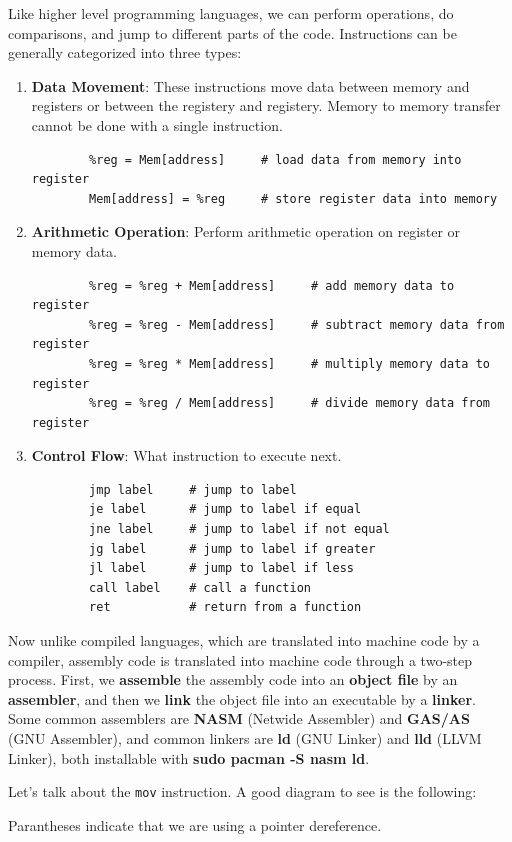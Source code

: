 \documentclass{article}
\begin{document}
  Like higher level programming languages, we can perform operations, do comparisons, and jump to different parts of the code. Instructions can be generally categorized into three types: 
  \begin{enumerate} 
    \item \textbf{Data Movement}: These instructions move data between memory and registers or between the registery and registery. Memory to memory transfer cannot be done with a single instruction. 
      \begin{lstlisting} 
        %reg = Mem[address]     # load data from memory into register
        Mem[address] = %reg     # store register data into memory
      \end{lstlisting}
    \item \textbf{Arithmetic Operation}: Perform arithmetic operation on register or memory data. 
      \begin{lstlisting} 
        %reg = %reg + Mem[address]     # add memory data to register
        %reg = %reg - Mem[address]     # subtract memory data from register
        %reg = %reg * Mem[address]     # multiply memory data to register
        %reg = %reg / Mem[address]     # divide memory data from register
      \end{lstlisting}
    \item \textbf{Control Flow}: What instruction to execute next. 
      \begin{lstlisting} 
        jmp label     # jump to label
        je label      # jump to label if equal
        jne label     # jump to label if not equal
        jg label      # jump to label if greater
        jl label      # jump to label if less
        call label    # call a function
        ret           # return from a function
      \end{lstlisting}
  \end{enumerate}

  Now unlike compiled languages, which are translated into machine code by a compiler, assembly code is translated into machine code through a two-step process. First, we \textbf{assemble} the assembly code into an \textbf{object file} by an \textbf{assembler}, and then we \textbf{link} the object file into an executable by a \textbf{linker}. Some common assemblers are \textbf{NASM} (Netwide Assembler) and \textbf{GAS/AS} (GNU Assembler), and common linkers are \textbf{ld} (GNU Linker) and \textbf{lld} (LLVM Linker), both installable with \textbf{sudo pacman -S nasm ld}. 

  \begin{definition}[mov]
    Let's talk about the \texttt{mov} instruction. A good diagram to see is the following: 
    \begin{center}  
    \end{center} 
    Parantheses indicate that we are using a pointer dereference. 
  \end{definition}
\end{document}
